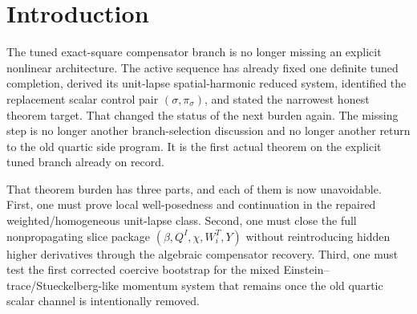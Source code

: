 \documentclass[11pt]{article}
\begin{document}
\begin{abstract}
The first post-local test is also positive. The low-frequency longitudinal source still couples to the trace sector through the same linear trace--longitudinal subsystem as on the repaired unit-lapse route, while the scalar correction is now built only from the transport/momentum pair \((\sigma,\pi_\sigma)\). The corrected functional
\[
\mathfrak F_N^{\mathrm{tc}}
=
\mathfrak E_N^{\mathrm{tc}}+\mathfrak C_N^{\mathrm{tc}}
\]
is equivalent to \(\mathfrak E_N^{\mathrm{tc}}\) and satisfies
\[
\frac{d}{dt}\mathfrak F_N^{\mathrm{tc}}(t)
\le
C_N\bigl(\mathfrak F_N^{\mathrm{tc}}(t)\bigr)^{3/2}.
\]
Consequently the first corrected tuned-compensator coercive bootstrap closes on times \(T\sim\varepsilon^{-1}\) without the old quartic scalar channel. At the present disciplined scope, the tuned branch therefore clears the local/coercive burden that was left open by the reduced-system note. Decay and asymptotic questions remain later work.
\end{abstract}

\section{Introduction}

The tuned exact-square compensator branch is no longer missing an explicit nonlinear architecture. The active sequence has already fixed one definite tuned completion, derived its unit-lapse spatial-harmonic reduced system, identified the replacement scalar control pair \((\sigma,\pi_\sigma)\), and stated the narrowest honest theorem target. That changed the status of the next burden again. The missing step is no longer another branch-selection discussion and no longer another return to the old quartic side program. It is the first actual theorem on the explicit tuned branch already on record.

That theorem burden has three parts, and each of them is now unavoidable. First, one must prove local well-posedness and continuation in the repaired weighted/homogeneous unit-lapse class. Second, one must close the full nonpropagating slice package \((\beta,Q^I,\chi,W_i^T,Y)\) without reintroducing hidden higher derivatives through the algebraic compensator recovery. Third, one must test the first corrected coercive bootstrap for the mixed Einstein--trace/Stueckelberg-like momentum system that remains once the old quartic scalar channel is intentionally removed.
\end{document}
